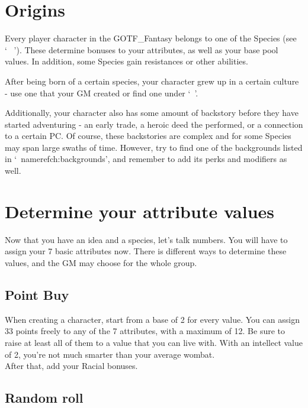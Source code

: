 \section{Origins}\label{sec:charCreationOrigins}

Every player character in the GOTF\_Fantasy belongs to one of the Species (see \lq~ \rq).
These determine bonuses to your attributes, as well as your base pool values. 
In addition, some Species gain resistances or other abilities.

After being born of a certain species, your character grew up in a certain culture - use one that your GM created or find one under \lq~\rq.

Additionally, your character also has some amount of backstory before they have started adventuring - an early trade, a heroic deed the performed, or a connection to a certain PC.
Of course, these backstories are complex and for some Species may span large swaths of time.
However, try to find one of the backgrounds listed in \lq~nameref{ch:backgrounds}\rq, and remember to add its perks and modifiers as well.


\section{Determine your attribute values}\label{sec:determineAttributes}

Now that you have an idea and a species, let's talk numbers.
You will have to assign your 7 basic attributes now.
There is different ways to determine these values, and the GM may choose for the whole group.


\subsection{Point Buy}\label{subsec:pointBuy}

When creating a character, start from a base of 2 for every value.
You can assign 33 points freely to any of the 7 attributes, with a maximum of 12.
Be sure to raise at least all of them to a value that you can live with.
With an intellect value of 2, you're not much smarter than your average wombat.\\
After that, add your Racial bonuses.


\subsection{Random roll}\label{subsec:pointRoll}

